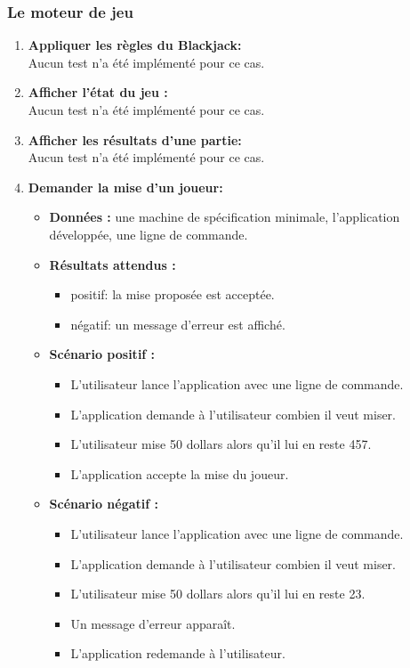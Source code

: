 \subsubsection{Le moteur de jeu}

\begin{enumerate}
    \item \textbf{Appliquer les règles du Blackjack:} \\
    Aucun test n'a été implémenté pour ce cas.

    \item \textbf{Afficher l'état du jeu :} \\
    Aucun test n'a été implémenté pour ce cas.

    \item \textbf{Afficher les résultats d'une partie:} \\
    Aucun test n'a été implémenté pour ce cas.

    \item \textbf{Demander la mise d'un joueur:}
    \begin{itemize}
        \item \textbf{Données :} une machine de spécification minimale, l'application développée, une ligne de commande.
        \item \textbf{Résultats attendus :}
        \begin{itemize}
            \item positif: la mise proposée est acceptée. 
            \item négatif: un message d'erreur est affiché.
        \end{itemize}
        \item \textbf{Scénario positif :}
        \begin{itemize}
            \item L'utilisateur lance l'application avec une ligne de commande.
            \item L'application demande à l'utilisateur combien il veut miser.
            \item L'utilisateur mise 50 dollars alors qu'il lui en reste 457.
            \item L'application accepte la mise du joueur.
        \end{itemize}
        \item \textbf{Scénario négatif :}
        \begin{itemize}
            \item L'utilisateur lance l'application avec une ligne de commande.
            \item L'application demande à l'utilisateur combien il veut miser.
            \item L'utilisateur mise 50 dollars alors qu'il lui en reste 23.
            \item Un message d'erreur apparaît.
            \item L'application redemande à l'utilisateur.
        \end{itemize}
    \end{itemize}


\end{enumerate}
